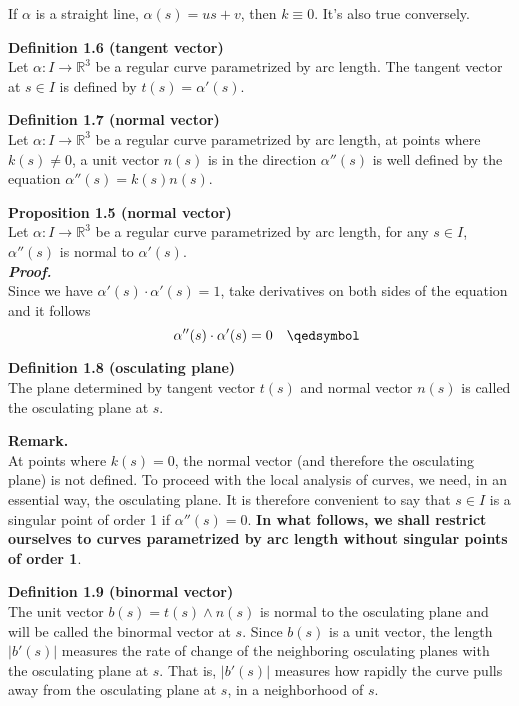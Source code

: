 \documentclass{article}
\begin{document}
\par
If $\alpha$ is a straight line, $\alpha(s) = us + v$, then $k \equiv 0$. It's also true conversely.

\par
\textbf{Definition 1.6 (tangent vector)}\\
Let $\alpha: I \to \mathbb R^3$ be a regular curve parametrized by arc length. The tangent vector at $s \in I$ is defined
by $t(s) = \alpha'(s)$.

\par
\textbf{Definition 1.7 (normal vector)}\\
Let $\alpha: I \to \mathbb R^3$ be a regular curve parametrized by arc length, at points where $k(s) \neq 0$,
a unit vector $n(s)$ is in the direction $\alpha''(s)$ is well defined by the equation
$\alpha''(s) = k(s)n(s)$.

\par
\textbf{Proposition 1.5 (normal vector)}\\
Let $\alpha: I \to \mathbb R^3$ be a regular curve parametrized by arc length, for any $s \in I$, $\alpha''(s)$ is normal to $\alpha'(s)$.\\
\textbf{\textit{Proof.}}\\
Since we have $\alpha'(s) \cdot \alpha'(s) = 1$, take derivatives on both sides of the equation and it follows
$$
    \quad \alpha''(s) \cdot \alpha'(s) = 0 \quad \qedsymbol
$$

\par
\textbf{Definition 1.8 (osculating plane)}\\
The plane determined by tangent vector $t(s)$ and normal vector $n(s)$ is called the osculating plane at $s$.

\par
\textbf{Remark.}\\
At points where $k(s) = 0$, the normal vector (and therefore the osculating plane) is not defined. To proceed
with the local analysis of curves, we need, in an essential way, the osculating plane. It is therefore convenient
to say that $s \in I$ is a singular point of order 1 if $\alpha''(s)=0$.
\textbf{In what follows, we shall restrict ourselves to curves parametrized by arc length without singular points
of order 1}.

\par
\textbf{Definition 1.9 (binormal vector)}\\
The unit vector $b(s) = t(s) \wedge n(s)$ is normal to the osculating plane and will be called
the binormal vector at $s$. Since $b(s)$ is a unit vector, the length $|b'(s)|$ measures the rate of
change of the neighboring osculating planes with the osculating plane at $s$. That is, $|b'(s)|$ measures
how rapidly the curve pulls away from the osculating plane at $s$, in a neighborhood of $s$.\\
\end{document}
